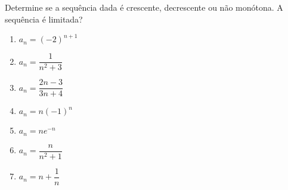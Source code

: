 \item\label{norms}
Determine se a sequência dada é crescente, decrescente ou não
monótona. A sequência é limitada?

\begin{multicols}{3}
    \begin{enumerate}
        \item $a_n = (-2)^{n+1}$
        \item $a_n = \dfrac{1}{n^2 + 3}$
        \item $a_n = \dfrac{2n - 3}{3n + 4}$
        \item $a_n = n(-1)^n$
        \item $a_n = ne^{-n}$
        \item $a_n = \dfrac{n}{n^2 + 1}$
        \item $a_n = n + \dfrac{1}{n}$
    \end{enumerate}
\end{multicols}